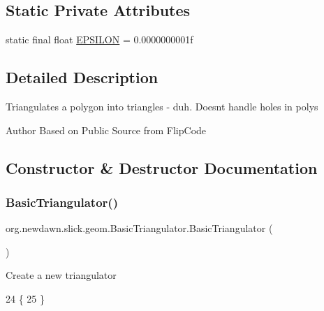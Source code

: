 \subsection*{Static Private Attributes}
\begin{DoxyCompactItemize}
\item 
static final float \mbox{\hyperlink{classorg_1_1newdawn_1_1slick_1_1geom_1_1_basic_triangulator_a6b5863b9215cbeab694b29c41e697110}{E\+P\+S\+I\+L\+ON}} = 0.\+0000000001f
\end{DoxyCompactItemize}


\subsection{Detailed Description}
Triangulates a polygon into triangles -\/ duh. Doesn\textquotesingle{}t handle holes in polys

\begin{DoxyAuthor}{Author}
Based on Public Source from Flip\+Code 
\end{DoxyAuthor}


\subsection{Constructor \& Destructor Documentation}
\mbox{\label{classorg_1_1newdawn_1_1slick_1_1geom_1_1_basic_triangulator_ae7d8ea74bd4e178920cc7d51a7d884f8}} 
\subsubsection{\texorpdfstring{Basic\+Triangulator()}{BasicTriangulator()}}
{\footnotesize\ttfamily org.\+newdawn.\+slick.\+geom.\+Basic\+Triangulator.\+Basic\+Triangulator (\begin{DoxyParamCaption}{ }\end{DoxyParamCaption})\hspace{0.3cm}{\ttfamily [inline]}}

Create a new triangulator 
\begin{DoxyCode}
24                                \{
25     \}
\end{DoxyCode}


